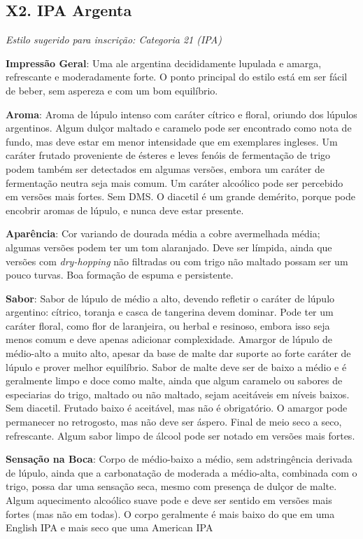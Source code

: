 \subsection*{X2. IPA Argenta}

\textit{Estilo sugerido para inscrição: Categoria 21 (IPA)}

\textbf{Impressão Geral}: Uma ale argentina decididamente lupulada e amarga, refrescante e moderadamente forte. O ponto principal do estilo está em ser fácil de beber, sem aspereza e com um bom equilíbrio.

\textbf{Aroma}: Aroma de lúpulo intenso com caráter cítrico e floral, oriundo dos lúpulos argentinos. Algum dulçor maltado e caramelo pode ser encontrado como nota de fundo, mas deve estar em menor intensidade que em exemplares ingleses. Um caráter frutado proveniente de ésteres e leves fenóis de fermentação de trigo podem também ser detectados em algumas versões, embora um caráter de fermentação neutra seja mais comum. Um caráter alcoólico pode ser percebido em versões mais fortes. Sem DMS. O diacetil é um grande demérito, porque pode encobrir aromas de lúpulo, e nunca deve estar presente.

\textbf{Aparência}: Cor variando de dourada média a cobre avermelhada média; algumas versões podem ter um tom alaranjado. Deve ser límpida, ainda que versões com \textit{dry-hopping} não filtradas ou com trigo não maltado possam ser um pouco turvas. Boa formação de espuma e persistente.

\textbf{Sabor}: Sabor de lúpulo de médio a alto, devendo refletir o caráter de lúpulo argentino: cítrico, toranja e casca de tangerina devem dominar. Pode ter um caráter floral, como flor de laranjeira, ou herbal e resinoso, embora isso seja menos comum e deve apenas adicionar complexidade. Amargor de lúpulo de médio-alto a muito alto, apesar da base de malte dar suporte ao forte caráter de lúpulo e prover melhor equilíbrio. Sabor de malte deve ser de baixo a médio e é geralmente limpo e doce como malte, ainda que algum caramelo ou sabores de especiarias do trigo, maltado ou não maltado, sejam aceitáveis em níveis baixos. Sem diacetil. Frutado baixo é aceitável, mas não é obrigatório. O amargor pode permanecer no retrogosto, mas não deve ser áspero. Final de meio seco a seco, refrescante. Algum sabor limpo de álcool pode ser notado em versões mais fortes.

\textbf{Sensação na Boca}: Corpo de médio-baixo a médio, sem adstringência derivada de lúpulo, ainda que a carbonatação de moderada a médio-alta, combinada com o trigo, possa dar uma sensação seca, mesmo com presença de dulçor de malte. Algum aquecimento alcoólico suave pode e deve ser sentido em versões mais fortes (mas não em todas). O corpo geralmente é mais baixo do que em uma English IPA e mais seco que uma American IPA

